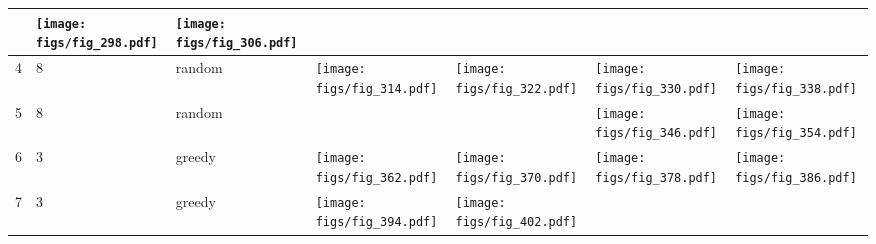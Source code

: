 \documentclass[oneside,canadian,landscape]{article}
\begin{document}
\begin{center}
\begin{longtable}{|l|l|l||l|l|l|l|}
\begin{minipage}{3.5cm}
\end{minipage}
&\begin{minipage}{3.5cm}
\texttt{[image: figs/fig\_298.pdf]}
\end{minipage}
&\begin{minipage}{3.5cm}
\texttt{[image: figs/fig\_306.pdf]}
\end{minipage}
\\ \hline
4&8&random&\begin{minipage}{3.5cm}
\texttt{[image: figs/fig\_314.pdf]}
\end{minipage}
&\begin{minipage}{3.5cm}
\texttt{[image: figs/fig\_322.pdf]}
\end{minipage}
&\begin{minipage}{3.5cm}
\texttt{[image: figs/fig\_330.pdf]}
\end{minipage}
&\begin{minipage}{3.5cm}
\texttt{[image: figs/fig\_338.pdf]}
\end{minipage}
\\ \hline
5&8&random&&&\begin{minipage}{3.5cm}
\texttt{[image: figs/fig\_346.pdf]}
\end{minipage}
&\begin{minipage}{3.5cm}
\texttt{[image: figs/fig\_354.pdf]}
\end{minipage}
\\ \hline
6&3&greedy&\begin{minipage}{3.5cm}
\texttt{[image: figs/fig\_362.pdf]}
\end{minipage}
&\begin{minipage}{3.5cm}
\texttt{[image: figs/fig\_370.pdf]}
\end{minipage}
&\begin{minipage}{3.5cm}
\texttt{[image: figs/fig\_378.pdf]}
\end{minipage}
&\begin{minipage}{3.5cm}
\texttt{[image: figs/fig\_386.pdf]}
\end{minipage}
\\ \hline
7&3&greedy&\begin{minipage}{3.5cm}
\texttt{[image: figs/fig\_394.pdf]}
\end{minipage}
&\begin{minipage}{3.5cm}
\texttt{[image: figs/fig\_402.pdf]}
\end{minipage}

\end{longtable}
\end{center}
\end{document}
